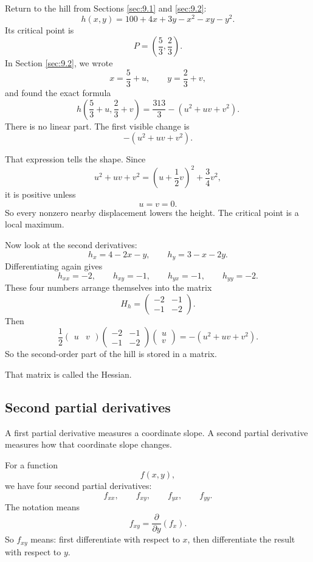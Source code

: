 Return to the hill from Sections \ref{sec:9.1} and \ref{sec:9.2}:
\[
    h(x,y)=100+4x+3y-x^2-xy-y^2.
\]
Its critical point is
\[
    P=\left(\frac53,\frac23\right).
\]
In Section \ref{sec:9.2}, we wrote
\[
    x=\frac53+u,
    \qquad
    y=\frac23+v,
\]
and found the exact formula
\[
    h\left(\frac53+u,\frac23+v\right)
    =
    \frac{313}{3}-(u^2+uv+v^2).
\]
There is no linear part.  The first visible change is
\[
    -(u^2+uv+v^2).
\]

That expression tells the shape.  Since
\[
    u^2+uv+v^2
    =
    \left(u+\frac12v\right)^2+\frac34v^2,
\]
it is positive unless
\[
    u=v=0.
\]
So every nonzero nearby displacement lowers the height.  The critical point is a local
maximum.

Now look at the second derivatives:
\[
    h_x=4-2x-y,
    \qquad
    h_y=3-x-2y.
\]
Differentiating again gives
\[
    h_{xx}=-2,
    \qquad
    h_{xy}=-1,
    \qquad
    h_{yx}=-1,
    \qquad
    h_{yy}=-2.
\]
These four numbers arrange themselves into the matrix
\[
    H_h=
    \begin{pmatrix}
        -2 & -1\\
        -1 & -2
    \end{pmatrix}.
\]
Then
\[
\frac12
\begin{pmatrix}u&v\end{pmatrix}
\begin{pmatrix}
        -2 & -1\\
        -1 & -2
\end{pmatrix}
\begin{pmatrix}u\\v\end{pmatrix}
=
-(u^2+uv+v^2).
\]
So the second-order part of the hill is stored in a matrix.

That matrix is called the Hessian.

\subsection{Second partial derivatives}

A first partial derivative measures a coordinate slope.  A second partial derivative
measures how that coordinate slope changes.

For a function
\[
    f(x,y),
\]
we have four second partial derivatives:
\[
    f_{xx},
    \qquad
    f_{xy},
    \qquad
    f_{yx},
    \qquad
    f_{yy}.
\]
The notation means
\[
    f_{xy}
    =
    \frac{\partial}{\partial y}\left(f_x\right).
\]
So \(f_{xy}\) means: first differentiate with respect to \(x\), then differentiate the
result with respect to \(y\).

